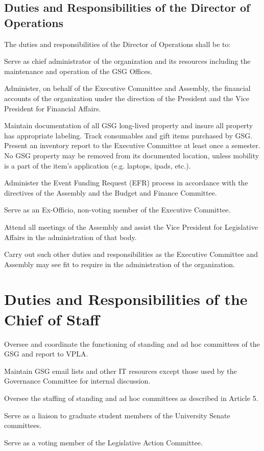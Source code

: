 \subsection{Duties and Responsibilities of the Director of Operations}
The duties and responsibilities of the Director of Operations shall be to:
\begin{bylaws-number}
  \item Serve as chief administrator of the organization and its resources including the maintenance and operation of the GSG Offices.
  \item Administer, on behalf of the Executive Committee and Assembly, the financial accounts of the organization under the direction of the President and the Vice President for Financial Affairs.
  \item Maintain documentation of all GSG long-lived property and insure all property has appropriate labeling. Track consumables and gift items purchased by GSG. Present an inventory report to the Executive Committee at least once a semester. No GSG property may be removed from its documented location, unless mobility is a part of the item’s application (e.g. laptops, ipads, etc.).
  \item Administer the Event Funding Request (EFR) process in accordance with the directives of the Assembly and the Budget and Finance Committee.
  \item Serve as an Ex-Officio, non-voting member of the Executive Committee.
  \item Attend all meetings of the Assembly and assist the Vice President for Legislative Affairs in the administration of that body.
  \item Carry out such other duties and responsibilities as the Executive Committee and Assembly may see fit to require in the administration of the organization.
\end{bylaws-number}

\section{Duties and Responsibilities of the Chief of Staff}
\begin{bylaws-number}
	\item Oversee and coordinate the functioning of standing and ad hoc committees of the GSG and report to VPLA.
	\item Maintain GSG email lists and other IT resources except those used by the Governance Committee for internal discussion.
	\item Oversee the staffing of standing and ad hoc committees as described in Article 5.
	\item Serve as a liaison to graduate student members of the University Senate committees.
	\item Serve as a voting member of the Legislative Action Committee.
\end{bylaws-number}

